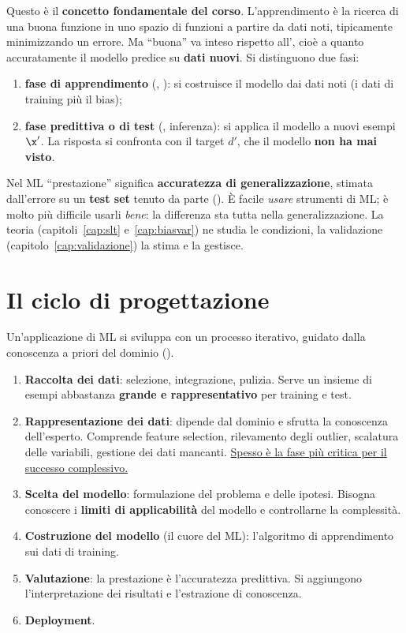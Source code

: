 Questo è il \textbf{concetto fondamentale del corso}. L'apprendimento è la ricerca di una buona funzione in uno
spazio di funzioni a partire da dati noti, tipicamente minimizzando un errore. Ma ``buona'' va inteso rispetto
all', cioè a quanto accuratamente il modello predice su \textbf{dati nuovi}.
Si distinguono due fasi:
\begin{enumerate}
  \item \textbf{fase di apprendimento} (, ): si costruisce il modello dai dati noti
        (i dati di training più il bias);
  \item \textbf{fase predittiva o di test} (, inferenza): si applica il modello a nuovi esempi
        $\x'$. La risposta si confronta con il target $d'$, che il modello \textbf{non ha mai visto}.
\end{enumerate}

\begin{idea}
Nel ML ``prestazione'' significa \textbf{accuratezza di generalizzazione}, stimata dall'errore su un
\textbf{test set} tenuto da parte (). È facile \emph{usare} strumenti di ML; è molto più
difficile usarli \emph{bene}: la differenza sta tutta nella generalizzazione. La teoria (capitoli~\ref{cap:slt}
e~\ref{cap:biasvar}) ne studia le condizioni, la validazione (capitolo~\ref{cap:validazione}) la stima e la
gestisce.
\end{idea}

\section{Il ciclo di progettazione}
\label{sec:ciclo}

Un'applicazione di ML si sviluppa con un processo iterativo, guidato dalla conoscenza a priori del dominio
().
\begin{enumerate}
  \item \textbf{Raccolta dei dati}: selezione, integrazione, pulizia. Serve un insieme di esempi abbastanza
        \textbf{grande e rappresentativo} per training e test.
  \item \textbf{Rappresentazione dei dati}: dipende dal dominio e sfrutta la conoscenza dell'esperto.
        Comprende feature selection, rilevamento degli outlier, scalatura delle variabili, gestione dei dati
        mancanti. \uline{Spesso è la fase più critica per il successo complessivo.}
  \item \textbf{Scelta del modello}: formulazione del problema e delle ipotesi. Bisogna conoscere i
        \textbf{limiti di applicabilità} del modello e controllarne la complessità.
  \item \textbf{Costruzione del modello} (il cuore del ML): l'algoritmo di apprendimento sui dati di training.
  \item \textbf{Valutazione}: la prestazione è l'accuratezza predittiva. Si aggiungono l'interpretazione dei
        risultati e l'estrazione di conoscenza.
  \item \textbf{Deployment}.
\end{enumerate}

